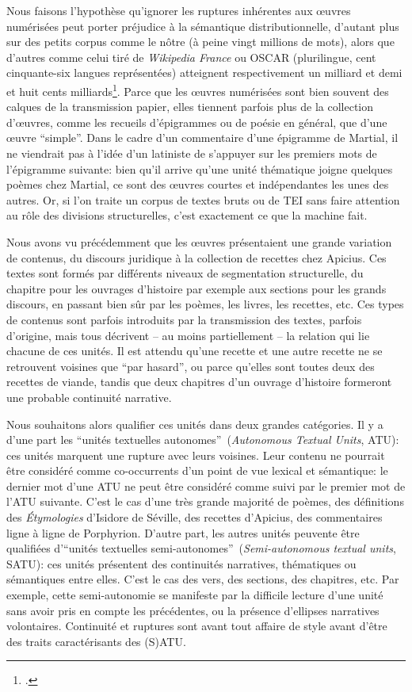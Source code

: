 Nous faisons l'hypothèse qu'ignorer les ruptures inhérentes aux œuvres numérisées peut porter préjudice à la sémantique distributionnelle, d'autant plus sur des petits corpus comme le nôtre (à peine vingt millions de mots), alors que d'autres comme celui tiré de \textit{Wikipedia France} ou OSCAR (plurilingue, cent cinquante-six langues représentées) atteignent respectivement un milliard et demi et huit cents milliards\footcite{noauthor_statistiques_nodate, ortizsuarez:hal02148693}. Parce que les œuvres numérisées sont bien souvent des calques de la transmission papier, elles tiennent parfois plus de la collection d'œuvres, comme les recueils d'épigrammes ou de poésie en général, que d'une œuvre \enquote{simple}. Dans le cadre d'un commentaire d'une épigramme de Martial, il ne viendrait pas à l'idée d'un latiniste de s'appuyer sur les premiers mots de l'épigramme suivante: bien qu'il arrive qu'une unité thématique joigne quelques poèmes chez Martial, ce sont des œuvres courtes et indépendantes les unes des autres. Or, si l'on traite un corpus de textes bruts ou de TEI sans faire attention au rôle des divisions structurelles, c'est exactement ce que la machine fait.

Nous avons vu précédemment que les œuvres présentaient une grande variation de contenus, du discours juridique à la collection de recettes chez Apicius. Ces textes sont formés par différents niveaux de segmentation structurelle, du chapitre pour les ouvrages d'histoire par exemple aux sections pour les grands discours, en passant bien sûr par les poèmes, les livres, les recettes, etc. Ces types de contenus sont parfois introduits par la transmission des textes, parfois d'origine, mais tous décrivent -- au moins partiellement -- la relation qui lie chacune de ces unités. Il est attendu qu'une recette et une autre recette ne se retrouvent voisines que \enquote{par hasard}, ou parce qu'elles sont toutes deux des recettes de viande, tandis que deux chapitres d'un ouvrage d'histoire formeront une probable continuité narrative.

Nous souhaitons alors qualifier ces unités dans deux grandes catégories. Il y a d'une part les \enquote{unités textuelles autonomes}~(\textit{Autonomous Textual Units}, ATU): ces unités marquent une rupture avec leurs voisines. Leur contenu ne pourrait être considéré comme co-occurrents d'un point de vue lexical et sémantique: le dernier mot d'une ATU ne peut être considéré comme suivi par le premier mot de l'ATU suivante. C'est le cas d'une très grande majorité de poèmes, des définitions des \textit{Étymologies} d'Isidore de Séville, des recettes d'Apicius, des commentaires ligne à ligne de Porphyrion. D'autre part, les autres unités peuvente être qualifiées d'\enquote{unités textuelles semi-autonomes}~(\textit{Semi-autonomous textual units}, SATU): ces unités présentent des continuités narratives, thématiques ou sémantiques entre elles. C'est le cas des vers, des sections, des chapitres, etc. Par exemple, cette semi-autonomie se manifeste par la difficile lecture d'une unité sans avoir pris en compte les précédentes, ou la présence d'ellipses narratives volontaires. Continuité et ruptures sont avant tout affaire de style avant d'être des traits caractérisants des (S)ATU.

